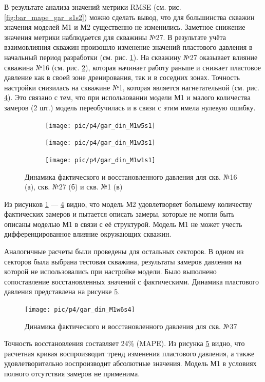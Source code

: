 \documentclass[14pt]{article}
\begin{document}
В результате анализа значений метрики RMSE (см. рис. \ref{fig:bar_mape_gar_s1s2}) можно сделать вывод, что для большинства скважин значения моделей М1 и М2 существенно не изменились. Заметное снижение значения метрики наблюдается для скважины №27.
В результате учёта взаимовлияния скважин произошло изменение значений пластового давления в начальный период разработки (см. рис. \ref{fig:din_gar_press_27M2}). На скважину №27 оказывает влияние скважина №16 (см. рис. \ref{fig:din_gar_press_16M2}), которая начинает работу раньше и снижает пластовое давление как в своей зоне дренирования, так и в соседних зонах.
Точность настройки снизилась на скважине №1, которая является нагнетательной (см. рис. \ref{fig:din_gar_press_1M2}). Это связано с тем, что при использовании модели М1 и малого количества замеров (2 шт.) модель переобучилась и в связи с этим имела нулевую ошибку. 
 \begin{figure}[!htb]
	\centering
	\begin{subfigure}[b]{0.9\linewidth}
		\texttt{[image: pic/p4/gar\_din\_M1w5s1]}
		\caption{}
		\label{fig:din_gar_press_27M2}
	\end{subfigure}
	\begin{subfigure}[b]{0.9\linewidth}
		\texttt{[image: pic/p4/gar\_din\_M1w3s1]}
		\caption{}
		\label{fig:din_gar_press_16M2}
	\end{subfigure}
	\begin{subfigure}[b]{0.9\linewidth}
		\texttt{[image: pic/p4/gar\_din\_M1w1s1]}
		\caption{}
		\label{fig:din_gar_press_1M2}
	\end{subfigure}
	\caption{Динамика фактического и восстановленного давления для скв. №16 (а), скв. №27 (б) и скв. №1 (в)}
\end{figure}
Из рисунков \ref{fig:din_gar_press_27M2} --- \ref{fig:din_gar_press_1M2} видно, что модель М2 удовлетворяет большему количеству фактических замеров и пытается описать замеры, которые не могли быть описаны моделью М1 в связи с её структурой. Модель М1 не может учесть дифференцированное влияние окружающих скважин.

Аналогичные расчеты были проведены для остальных секторов. В одном из секторов была выбрана тестовая скважина, результаты замеров давления на которой не использовались при настройке модели. Было выполнено сопоставление восстановленных значений с фактическими. Динамика пластового давления представлена на рисунке \ref{fig:gar_din_M1w6s4}.
\begin{figure}[!htb]
	\centering
	\texttt{[image: pic/p4/gar\_din\_M1w6s4]}
	\caption{Динамика фактического и восстановленного давления для скв. №37}
	\label{fig:gar_din_M1w6s4}
\end{figure}
Точность восстановления составляет 24\% (MAPE). Из рисунка \ref{fig:gar_din_M1w6s4} видно, что расчетная кривая воспроизводит тренд изменения пластового давления, а также удовлетворительно воспроизводит абсолютные значения. Модель М1 в условиях полного отсутствия замеров не применима.  
 
\end{document}
